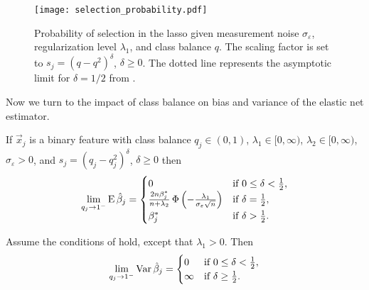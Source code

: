 \begin{figure}[htpb]
  \centering
  \texttt{[image: selection\_probability.pdf]}
  \caption{%
    Probability of selection in the lasso given measurement noise
    \(\sigma_\varepsilon\), regularization level \(\lambda_1\), and class
    balance \(q\). The scaling factor is set to \(s_j = (q - q^2)^\delta\),
    \(\delta \geq 0\). The dotted line represents the asymptotic limit for
    \(\delta = 1/2\) from .
    \label{fig:selection-probability}}
\end{figure}


Now we turn to the impact of class balance on bias and variance of the elastic net
estimator.

\begin{theorem}
  \label{thm:classbalance-bias}
  If \(\vec{x}_j\) is a binary feature with class balance \(q_j \in (0, 1)\),
  \(\lambda_1 \in [0,\infty)\), \(\lambda_2 \in [0,\infty)\),
  \(\sigma_\varepsilon > 0\), and \(s_j = (q_j - q_j^2)^{\delta}\), \(\delta
  \geq 0\)  then
  \[
    \lim_{q_j \rightarrow 1^-} \operatorname{E} \hat{\beta}_j =
    \begin{cases}
      0                                                                                                  & \text{if } 0 \leq \delta < \frac{1}{2}, \\
      \frac{2n \beta_j^*}{n + \lambda_2} \operatorname{\Phi}\left(-\frac{\lambda_1}{\sigma_\varepsilon \sqrt{n}}\right) & \text{if } \delta = \frac{1}{2},        \\
      \beta^*_j                                                                                          & \text{if } \delta > \frac{1}{2}.
    \end{cases}
  \]
\end{theorem}

\begin{theorem}
  \label{thm:classbalance-variance}
  Assume the conditions of  hold, except that
  \(\lambda_1 > 0\). Then
  \[
    \lim_{q_j \rightarrow 1^-} \operatorname{Var} \hat{\beta}_j =
    \begin{cases}
      0      & \text{if } 0 \leq \delta < \frac{1}{2}, \\
      \infty & \text{if } \delta \geq \frac{1}{2}.
    \end{cases}
  \]
\end{theorem}

